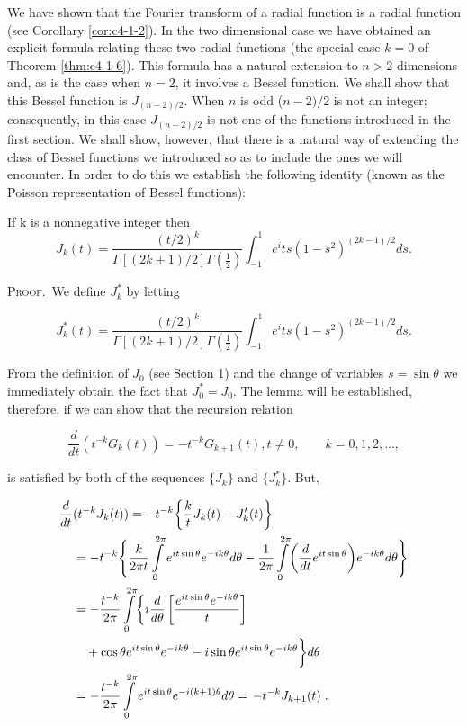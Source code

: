 We have shown that the Fourier transform of a radial function is a radial function (see Corollary \ref{cor:c4-1-2}). In the two dimensional case we have obtained an explicit formula relating these two radial functions (the special case $k=0$ of Theorem \ref{thm:c4-1-6}). This formula has a natural extension to $n>2$ dimensions and, as is the case when $n=2$, it involves a Bessel function. We shall show that this Bessel function is $J_{(n-2)/2}$. When $n$ is odd ($n-2)/2$ is not an integer; consequently, in this case $J_{(n-2)/2}$ is not one of the functions introduced in the first section. We shall show, however, that there is a natural way of extending the class of Bessel functions we introduced so as to include the ones we will encounter. In order to do this we establish the following identity (known as the Poisson representation of Bessel functions):

\begin{lemma}
\label{lem:c4-3-1}
If k is a nonnegative integer then
\[
J_{k}(t)=\frac{(t/2)^{k}}{\Gamma[(2k+1)/2]\Gamma(\frac{1}{2})}\int_{-1}^{1}e^its(1-s^{2})^{(2k-1)/2}d s.
\]

\end{lemma}

\textsc{Proof.}\ We define $J_k^*$ by letting

\[
J_{k}^{*}(t)=\frac{(t/2)^{k}}{\Gamma[(2k+1)/2]\Gamma(\frac{1}{2})}\int_{-1}^{1}e^its(1-s^{2})^{(2k-1)/2}d s.
\]

From the definition of $J_0$ (see Section 1) and the change of variables $s = \sin \theta$ we immediately obtain the fact that $J_0^* = J_0$. The lemma will be established, therefore, if we can show that the recursion relation

\begin{equation}\label{eq:c4-3-2}
\frac{d}{d t}\left(t^{-k}G_{k}(t)\right)=-t^{-k}G_{k+1}(t),t\neq0,\qquad k=0,1,2,\ldots,
\end{equation}

is satisfied by both of the sequences $\{J_{k}\}$ and $\{J_{k}^{*}\}$. But,

\[
\begin{aligned}{\frac{d}{d t}}&{{}(t^{-k}J_{k}(t))=-t^{-k}\biggl\{\frac{k}{t}J_{k}(t)-J_{k}^{\prime}(t)\biggr\}}\\ {}&{{}=-t^{-k}\Biggl\{\frac{k}{2\pi t}\intop_{0}^{2\pi}e^{i t\sin\theta}e^{-i k\theta}d\theta-\frac{1}{2\pi}\intop_{0}^{2\pi}\biggl(\frac{d}{d t}e^{i t\sin\theta}\biggr)e^{-i k\theta}d\theta\Biggr\}}\\ {}&{{}=-\frac{t^{-k}}{2\pi}\intop_{0}^{2\pi}\biggl\{i\frac{d}{d\theta}\left[\frac{e^{i t\sin\theta}e^{-i k\theta}}{t}\right]}\\
 {}&{{}\quad+\cos\theta e^{i t\sin\theta}e^{-i k\theta}-i\sin\theta e^{i t\sin\theta}e^{-i k\theta}\biggr\}d\theta}\\ {}&{{}=-\frac{t^{-k}}{2\pi}\intop_{0}^{2\pi}e^{i t\sin\theta}e^{-i(k+1)\theta}d\theta=\left.-t^{-k}J_{k+1}(t)\right..}\\ \end{aligned}
\]

